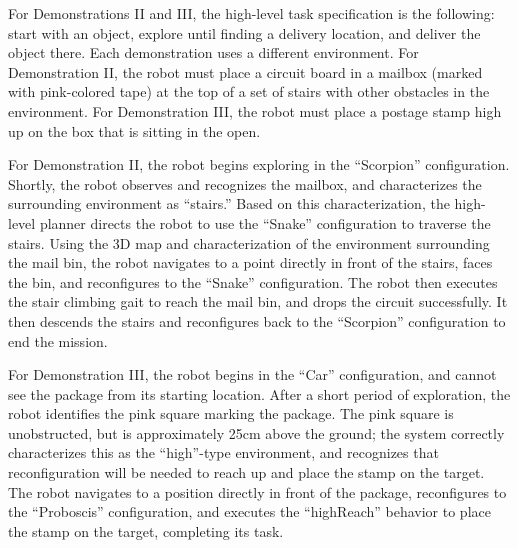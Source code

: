 \documentclass[12pt]{article}
\begin{document}
For Demonstrations II and III, the high-level task specification is the following: start with an object, explore until finding a delivery location, and deliver the object there. Each demonstration uses a different environment. For Demonstration II, the robot must place a circuit board in a mailbox (marked with pink-colored tape) at the top of a set of stairs with other obstacles in the environment. For Demonstration III, the robot must place a postage stamp high up on the box that is sitting in the open.

For Demonstration II, the robot begins exploring in the ``Scorpion'' configuration. Shortly, the robot observes and recognizes the mailbox, and characterizes the surrounding environment as ``stairs.'' Based on this characterization, the high-level planner directs the robot to use the ``Snake'' configuration to traverse the stairs. Using the 3D map and characterization of the environment surrounding the mail bin, the robot navigates to a point directly in front of the stairs, faces the bin, and reconfigures to the ``Snake'' configuration. The robot then executes the stair climbing gait to reach the mail bin, and drops the circuit successfully. It then descends the stairs and reconfigures back to the ``Scorpion'' configuration to end the mission.

For Demonstration III, the robot begins in the ``Car'' configuration, and cannot see the package from its starting location.  After a short period of exploration, the robot identifies the pink square marking the package.  The pink square is unobstructed, but is approximately 25cm above the ground; the system correctly characterizes this as the ``high''-type environment, and recognizes that reconfiguration will be needed to reach up and place the stamp on the target.  The robot navigates to a position directly in front of the package, reconfigures to the ``Proboscis'' configuration, and executes the ``highReach'' behavior to place the stamp on the target, completing its task.
%
\end{document}

